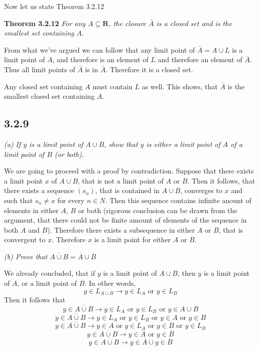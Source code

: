 \documentclass[11pt,oneside,titlepage]{book}
\begin{document}
Now let us state Theorem 3.2.12

\textbf{Theorem 3.2.12} \textit{For any $A \subseteq \textbf{R}$, the closure
  $\bar{A}$ is a closed set and is the smallest set containing $A$.}

From what we've argued we can follow that any limit point of $\bar A = A \cup L$
is a limit point of $A$, and therefore is an element of $L$ and therefore an
element of $\bar{A}$.  Thus all limit points of $\bar A$ is in $\bar A$. Therefore
it is a closed set.

Any closed set containing $A$ must contain $L$ as well. This shows, that $\bar A$
is the smallest closed set containing $A$.

\subsection*{3.2.9}

\textit{(a) If $y$ is a limit point of $A \cup B$, show that $y$ is either a limit
  point of $A$ of a limit point of $B$ (or both).}


We are going to proceed with a proof by contradiction. Suppose that there exists a
limit point $x$ of $A \cup B$, that is not a limit point of $A$ or $B$. Then it
follows, that there exists a sequence $(s_n)$, that is contained in $A \cup B$,
converges to $x$ and such that $s_n \neq x$ for every $n \in N$. Then this
sequence contains infinite anount of elements in either $A$, $B$ or both
(rigorous conclusion can be drawn from the argument, that there could not
be finite amount of elements of the sequence in both $A$ and $B$).
Therefore there exists a subsequence in either $A$ or $B$, that is convergent to
$x$. Therefore $x$ is a limit point for either $A$ or $B$.

\textit{(b) Prove that $\overline{A \cup B} = \overline A \cup \overline B$}

We already concluded, that if $y$ is a limit point of $A \cup B$, then $y$ is a limit point
of $A$, or a limit point of $B$. In other words,
$$y \in L_{A\cup B} \to y \in L_A \text{ or } y \in L_B$$
Then it follows that
$$y \in \overline{A\cup B} \to y \in L_A \text{ or } y \in L_B \text{ or } y \in A \cup B$$
$$y \in \overline{A\cup B} \to y \in L_A \text{ or } y \in L_B \text{ or } y \in A
\text{ or } y \in B$$
$$y \in \overline{A\cup B} \to   y \in A \text{ or }  y \in L_A 
\text{ or } y \in B \text{ or }  y \in L_B$$
$$y \in \overline{A\cup B} \to   y \in \overline A
\text{ or } y \in \overline B $$
$$y \in \overline{A\cup B} \to   y \in \overline A
\cup y \in \overline B $$
\end{document}
